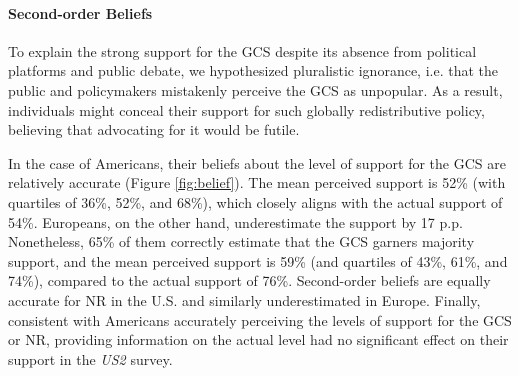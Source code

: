 \begin{bibunit}
\begin{tcolorbox}\label{subsec:second_order_beliefs}
  \paragraph{Second-order Beliefs}
To explain the strong support for the GCS despite its absence from political platforms and public debate, we hypothesized pluralistic ignorance, i.e. that the public and policymakers mistakenly perceive the GCS as unpopular. As a result, individuals might conceal their support for such globally redistributive policy, believing that advocating for it would be futile. 

In the case of Americans, their beliefs about the level of support for the GCS are relatively accurate (Figure \ref{fig:belief}). The mean perceived support is 52\% (with quartiles of 36\%, 52\%, and 68\%), which closely aligns with the actual support of 54\%. Europeans, on the other hand, underestimate the support by 17 p.p. Nonetheless, 65\% of them correctly estimate that the GCS garners majority support, and the mean perceived support is 59\% (and quartiles of 43\%, 61\%, and 74\%), compared to the actual support of 76\%. %
Second-order beliefs are equally accurate for NR in the U.S. and similarly underestimated in Europe. %
Finally, consistent with Americans accurately perceiving the levels of support for the GCS or NR, providing information on the actual level had no significant effect on their support in the \textit{US2} survey. %
\end{tcolorbox}



\end{bibunit}
